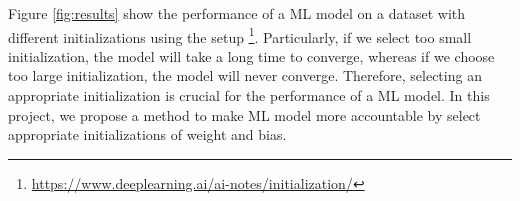 Figure \ref{fig:results} show the performance of a ML model on a dataset with different initializations using the setup \footnote{\small \url{https://www.deeplearning.ai/ai-notes/initialization/}}. Particularly, if we select too small initialization, the model will take a long time to converge, whereas if we choose too large initialization, the model will never converge. Therefore, selecting an appropriate initialization is crucial for the performance of a ML model. In this project, we propose a method to make ML model more accountable by select appropriate initializations of weight and bias. 
%
%
%
%
%
